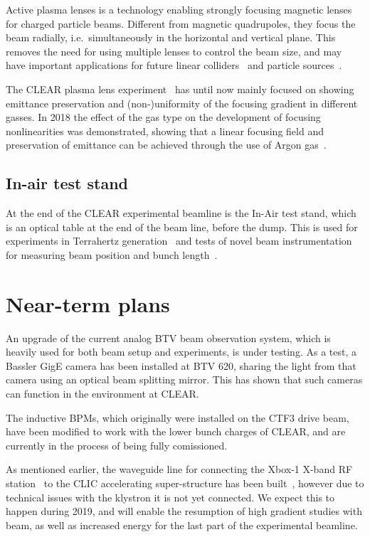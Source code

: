 \documentclass[a4paper,
               keeplastbox,   %
               ]{jacow}
\begin{document}
Active plasma lenses is a technology enabling strongly focusing magnetic lenses for charged particle beams.
Different from magnetic quadrupoles, they focus the beam radially, i.e.\ simultaneously in the horizontal and vertical plane.
This removes the need for using multiple lenses to control the beam size, and may have important applications for future linear colliders~\cite{CarlApochromatic,SteinkeCoupling} and particle sources~\cite{Braun1}.

The CLEAR plasma lens experiment~\cite{CLEAR-PLE,Erik::CLEARrev} has until now mainly focused on showing emittance preservation and (non-)uniformity of the focusing gradient in different gasses.
In 2018 the effect of the gas type on the development of focusing nonlinearities was demonstrated, showing that a linear focusing field and preservation of emittance can be achieved through the use of Argon gas~\cite{CarlPRL}.

\subsection{In-air test stand}

At the end of the CLEAR experimental beamline is the In-Air test stand, which is an optical table at the end of the beam line, before the dump.
This is used for experiments in Terrahertz generation~\cite{CurcioPRAB} and tests of novel beam instrumentation for measuring beam position and bunch length~\cite{Thibaut::CLEARrev}.

\section{Near-term plans}

An upgrade of the current analog BTV beam observation system, which is heavily used for both beam setup and experiments, is under testing.
As a test, a Bassler GigE camera has been installed at BTV 620, sharing the light from that camera using an optical beam splitting mirror.
This has shown that such cameras can function in the environment at CLEAR.

The inductive BPMs, which originally were installed on the CTF3 drive beam, have been modified to work with the lower bunch charges of CLEAR, and are currently in the process of being fully comissioned.

As mentioned earlier, the waveguide line for connecting the Xbox-1 X-band RF station~\cite{Xbox1,Xboxen} to the CLIC accelerating super-structure has been built~\cite{Pitman:IPAC19-WEPRB063}, however due to technical issues with the klystron it is not yet connected.
We expect this to happen during 2019, and will enable the resumption of high gradient studies with beam, as well as increased energy for the last part of the experimental beamline.
\end{document}
